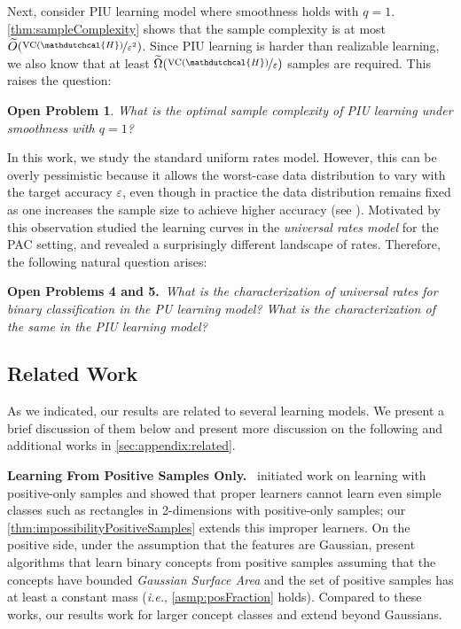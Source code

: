 \documentclass[11pt]{article}
\theoremstyle{plain}
\newtheorem{openproblem}{Open Problem}
\theoremstyle{definition}
\theoremstyle{remark}
\newcommand{\nfrac}[2]{\nicefrac{#1}{#2}}
\newcommand{\vc}{\textrm{\rm VC}}
\newcommand{\eps}{\varepsilon}
\newcommand{\wt}[1]{\widetilde{#1}}
\renewcommand{\paragraph}[1]{\medskip \noindent\textbf{#1}~}
\newcommand{\ie}{\textit{i.e.}}
\newcommand{\hypo}[1]{\mathdutchcal{#1}}
\newcommand{\hyH}{\hypo{H}}
\begin{document}
        Next, consider PIU learning model where smoothness holds with $q=1$.
        \cref{thm:sampleComplexity} shows that the sample complexity is at most $\wt{O}(\nfrac{\vc{}(\hyH)}{\eps^2})$.
        Since PIU learning is harder than realizable learning, we also know that at least $\wt{\Omega}(\nfrac{\vc{}(\hyH)}{\eps})$ samples are required.
        This raises the question:
        \begin{openproblem}
            What is the optimal sample complexity of PIU learning under smoothness with $q=1$?
        \end{openproblem}
        In this work, we study the standard uniform rates model.
        However, this can be overly pessimistic because it allows the worst-case data distribution to vary with the target accuracy $\varepsilon$, even though in practice the data distribution remains fixed as one increases the sample size to achieve higher accuracy (see \cite{bousquet2021universal}).
        Motivated by this observation  \citet*{bousquet2021universal} studied the learning curves in the \textit{universal rates model} for the PAC setting, and revealed a surprisingly different landscape of rates.
        Therefore, the following natural question arises: 
        \medskip

        \noindent \textbf{Open Problems 4 and 5.}~\emph{What is the characterization of universal rates for binary classification in the PU learning model?
            What is the characterization of the same in the PIU learning model?}
        

        
 
    \subsection{Related Work}\label{sec:intro:relatedWorks}
        As we indicated, our results are related to several learning models. We present a brief discussion of them below and present more discussion on the following and additional  works in \cref{sec:appendix:related}.
    
         \paragraph{Learning From Positive Samples Only.} \citet{natarajan1987learning} initiated work on learning with positive-only samples and showed that proper learners cannot learn even simple classes such as rectangles in 2-dimensions with positive-only samples; our \cref{thm:impossibilityPositiveSamples} extends this improper learners.
         On the positive side, under the assumption that the features are  Gaussian, \citet{Kontonis2019EfficientTS,lee2024unknown} present algorithms that learn binary concepts from positive samples assuming that the concepts have bounded \textit{Gaussian Surface Area} and the set of positive samples has at least a constant mass (\ie{}, \cref{asmp:posFraction} holds). 
        Compared to these works, our results work for larger concept classes and extend beyond Gaussians.
\end{document}
